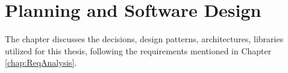 \newpage
\chapter{Planning and Software Design}
\label{chap:design}
The chapter discusses the decisions, design patterns, architectures, libraries utilized for this thesis, following the requirements mentioned in 
Chapter \ref{chap:ReqAnalysis}.

%





%



